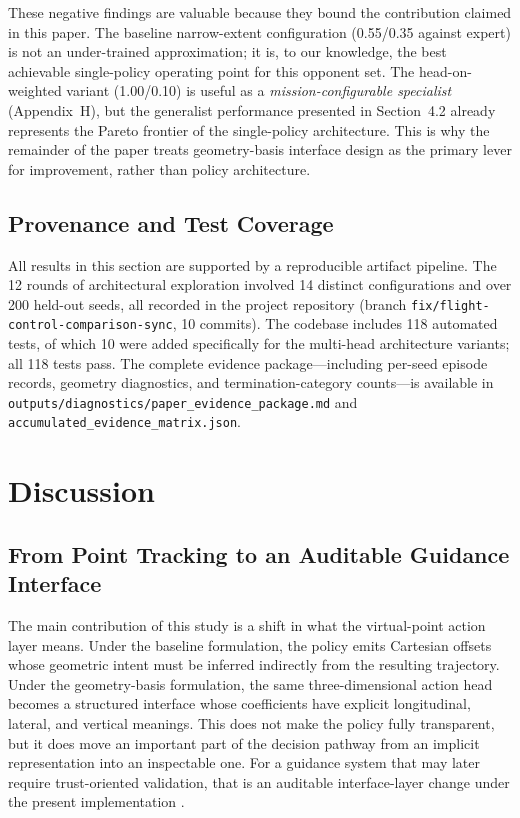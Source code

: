 \documentclass[drones,article,submit,pdftex,moreauthors]{Definitions/mdpi}
\begin{document}
These negative findings are valuable because they bound the contribution claimed in this paper. The baseline narrow-extent configuration (0.55/0.35 against expert) is not an under-trained approximation; it is, to our knowledge, the best achievable single-policy operating point for this opponent set. The head-on-weighted variant (1.00/0.10) is useful as a \emph{mission-configurable specialist} (Appendix~H), but the generalist performance presented in Section~4.2 already represents the Pareto frontier of the single-policy architecture. This is why the remainder of the paper treats geometry-basis interface design as the primary lever for improvement, rather than policy architecture.

\subsection{Provenance and Test Coverage}

All results in this section are supported by a reproducible artifact pipeline. The 12 rounds of architectural exploration involved 14 distinct configurations and over 200 held-out seeds, all recorded in the project repository (branch \texttt{fix/flight-control-comparison-sync}, 10 commits). The codebase includes 118 automated tests, of which 10 were added specifically for the multi-head architecture variants; all 118 tests pass. The complete evidence package---including per-seed episode records, geometry diagnostics, and termination-category counts---is available in \texttt{outputs/diagnostics/paper\_evidence\_package.md} and \texttt{accumulated\_evidence\_matrix.json}.

\section{Discussion}

\subsection{From Point Tracking to an Auditable Guidance Interface}

The main contribution of this study is a shift in what the virtual-point action layer means. Under the baseline formulation, the policy emits Cartesian offsets whose geometric intent must be inferred indirectly from the resulting trajectory. Under the geometry-basis formulation, the same three-dimensional action head becomes a structured interface whose coefficients have explicit longitudinal, lateral, and vertical meanings. This does not make the policy fully transparent, but it does move an important part of the decision pathway from an implicit representation into an inspectable one. For a guidance system that may later require trust-oriented validation, that is an auditable interface-layer change under the present implementation \cite{glanois2024,paterson2025}.
\end{document}
